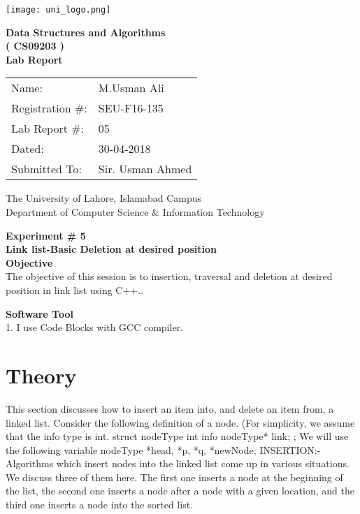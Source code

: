 \documentclass[11pt]{article}            %
\begin{document}
\begin{titlepage}
    \centering
  \vfill
    \texttt{[image: uni\_logo.png]} \\ 
	\vskip2cm
    {\bfseries\Large
	Data Structures and Algorithms \\ ( CS09203 )\\
	
	\vskip2cm
	Lab Report 
	 
	\vskip2cm
	}    

\begin{center}
\begin{tabular}{ l l  } 

Name: & M.Usman Ali \\ 
Registration \#: & SEU-F16-135 \\ 
Lab Report \#: & 05 \\ 
 Dated:& 30-04-2018\\ 
Submitted To:& Sir. Usman Ahmed\\ 

\end{tabular}
\end{center}
    \vfill
    The University of Lahore, Islamabad Campus\\
Department of Computer Science \& Information Technology
\end{titlepage}


    
    {\bfseries\Large
\centering
	Experiment \# 5 \\

Link list-Basic Deletion at desired position\\
	
	}    
 \vskip1cm
 \textbf {Objective}\\The objective of this session is to insertion, traversal and deletion at desired position in link list
using C++.. 
 
 \textbf {Software Tool}\\
1.  I use Code Blocks with GCC compiler.\\

\section{Theory }           This section discusses how to insert an item into, and delete an item from, a linked list.
Consider the following definition of a node. (For simplicity, we assume that the info type is int.
struct nodeType
{
int info nodeType* link;
};
We will use the following variable nodeType
*head, *p, *q, *newNode; INSERTION:-
Algorithms which insert nodes into the linked list come up in various situations. We discuss
three of them here. The first one inserts a node at the beginning of the list, the second one inserts
a node after a node with a given location, and the third one inserts a node into the sorted list.
\end{document}
